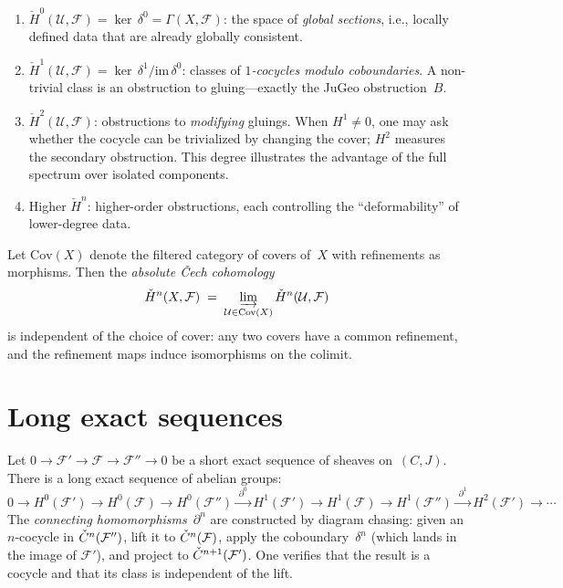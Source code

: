 \begin{proposition}
\label{prop:degree-interp}
\hfill
\begin{enumerate}[label=(\alph*),nosep]
\item $\check{H}^0(\mathcal{U}, \mathcal{F}) = \ker\, \delta^0
  = \Gamma(X, \mathcal{F})$: the space of \emph{global sections},
  i.e., locally defined data that are already globally consistent.
\item $\check{H}^1(\mathcal{U}, \mathcal{F})
  = \ker\, \delta^1 / \mathrm{im}\, \delta^0$: classes of
  \emph{$1$-cocycles modulo coboundaries}.  A non-trivial class is an
  obstruction to gluing---exactly the JuGeo obstruction~$B$.
\item $\check{H}^2(\mathcal{U}, \mathcal{F})$: obstructions to
  \emph{modifying} gluings.  When $H^1 \neq 0$, one may ask whether the
  cocycle can be trivialized by changing the cover; $H^2$ measures
  the secondary obstruction.  This degree illustrates the advantage
  of the full spectrum over isolated components.
\item Higher $\check{H}^n$: higher-order obstructions, each
  controlling the ``deformability'' of lower-degree data.
\end{enumerate}
\end{proposition}

\begin{theorem}
\label{thm:cover-independence}
Let $\mathrm{Cov}(X)$ denote the filtered category of covers of~$X$
with refinements as morphisms.  Then the \emph{absolute \v{C}ech
cohomology}
\[
  \check{H}^n(X, \mathcal{F})
  \;=\;
  \varinjlim_{\mathcal{U} \in \mathrm{Cov}(X)}
  \check{H}^n(\mathcal{U}, \mathcal{F})
\]
is independent of the choice of cover: any two covers have a common
refinement, and the refinement maps induce isomorphisms on the
colimit.
\end{theorem}

\section{Long exact sequences}
\label{sec:les}

\begin{theorem}
\label{thm:les}
Let $0 \to \mathcal{F}' \to \mathcal{F} \to \mathcal{F}'' \to 0$ be a
short exact sequence of sheaves on~$(C,J)$.  There is a long exact
sequence of abelian groups:
\[
  0 \to H^0(\mathcal{F}') \to H^0(\mathcal{F}) \to H^0(\mathcal{F}'')
  \xrightarrow{\;\partial^0\;}
  H^1(\mathcal{F}') \to H^1(\mathcal{F}) \to H^1(\mathcal{F}'')
  \xrightarrow{\;\partial^1\;} H^2(\mathcal{F}') \to \cdots
\]
The \emph{connecting homomorphisms}~$\partial^n$ are constructed by
diagram chasing: given an $n$-cocycle in $\check{C}^n(\mathcal{F}'')$,
lift it to $\check{C}^n(\mathcal{F})$, apply the coboundary~$\delta^n$
(which lands in the image of $\mathcal{F}'$), and project to
$\check{C}^{n+1}(\mathcal{F}')$.  One verifies that the result is a
cocycle and that its class is independent of the lift.
\end{theorem}

